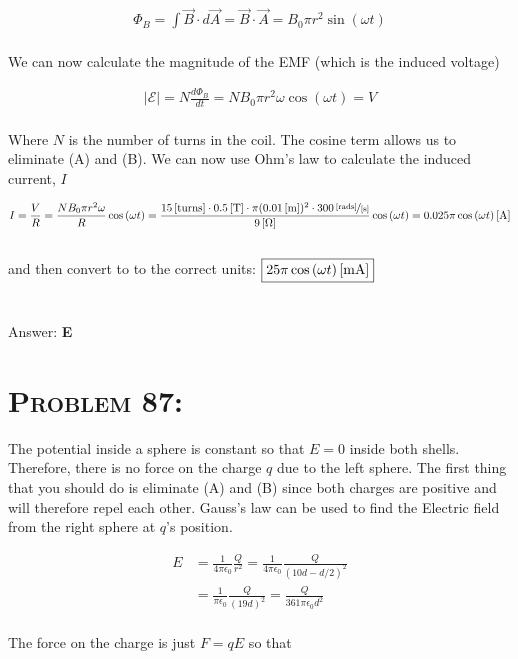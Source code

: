 \documentclass{article}
\begin{document}
\begin{gather}
\Phi_{B} = \int{\vec{B} \cdot d\vec{A}} = \vec{B} \cdot \vec{A} = B_{0} \pi r^{2} \sin{(\omega t)} \nonumber
\end{gather}
\\
We can now calculate the magnitude of the EMF (which is the induced voltage)

\begin{gather}
\left| \mathcal{E}  \right| = N \frac{d \Phi_{B}}{d t} = N   B_{0}  \pi r^{2} \omega \cos{(\omega t)} = V
\end{gather}
\\
Where $N$ is the number of turns in the coil. The cosine term allows us to eliminate (A) and (B). We can now use Ohm's law to calculate the induced current, $I$

\begin{gather}
I = \frac{V}{R} = \frac{N   B_{0}  \pi r^{2} \omega}{R} \cos{(\omega t)} = \frac{\unit[15]{[turns]} \cdot \unit[0.5]{[T]} \cdot \pi (\unit[0.01]{[m]})^{2}\cdot \unitfrac[300]{[rads]}{[s]}}{\unit[9]{[\Omega]}} \cos{(\omega t)} = \unit[0.025 \pi  \cos{(\omega t)}] {[A]}\nonumber
\end{gather}
\\
and then convert to to the correct units: $\boxed{\unit[25 \pi  \cos{(\omega t)}] {[mA]}}$\\
\\\\
Answer: \textbf{\textcolor{ProcessBlue}E}\\


\section{\textsc{Problem 87:}} The potential inside a sphere is constant so that $E = 0$ inside both shells. Therefore, there is no force on the charge $q$ due to the left sphere. The first thing that you should do is eliminate (A) and (B) since both charges are positive and will therefore repel each other. Gauss's law can be used to find the Electric field from the right sphere at $q$'s position.

\begin{align}
E &= \frac{1}{4 \pi \epsilon_{0}} \frac{Q}{r^{2}} = \frac{1}{4 \pi \epsilon_{0}} \frac{Q}{(10d -d/2)^{2}}\nonumber\\
&= \frac{1}{\pi \epsilon_{0}} \frac{Q}{(19d)^{2}} = \frac{Q}{361 \pi \epsilon_{0}  d^{2}}\nonumber
\end{align}
\\
The force on the charge is just $F = qE$ so that
\end{document}
